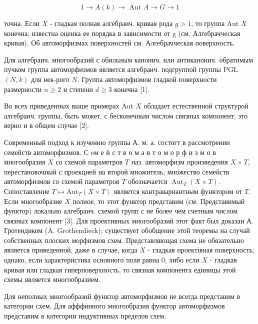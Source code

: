\documentclass[10pt]{article}
\begin{document}
\[

1 \longrightarrow A(k) \longrightarrow \text { Aut } A \longrightarrow G \longrightarrow 1

\]



точна. Если $X$ - гладкая полная алгебраич. кривая рода $g>1$, то группа Aut $X$ конечна; известна оценка ее порядка в зависимости от g (см. Алгебрачческая кривая). Об автоморфизмах поверхностей см. Алгебрачческая поверхность.



Для алгебраич. многообразий с обильным канонич. или антиканонич. обратимым пучком группа автоморфизмов является алгебраич. подгруппой группы PGL $(N, k)$ для нек-рого $N$. Группа автоморфизмов гладкой поверхности размерности $n \geqslant 2$ и степени $d \geqslant 3$ конечна [1].



Во всех приведенных выше примерах Aut $X$ обладает естественной структурой алгебраич. группы, быть может, с бесконечным числом связных компонент; это верно и в общем случае [2].



Современный подход к изучению группы А. м. а. состогт в рассмотрении семейств автоморфизмов. С eм е ӥ с т в о м а в т о м о р ф и з м о в многообразия $X$ со схемой параметров $T$ наз. автоморфизм произведения $X \times T$, перестановочный с проекцией на второй множитель; множество семейств автоморфизмов со схемой параметров $T$ обозначается $\operatorname{Aut}_{T}(X \times T)$. Сопоставление $T \mapsto \mathrm{Aut}_{T}(X \times T)$ является контравариантным функтором от $T$. Если многообразие $X$ полное, то этот функтор представим (см. Представимый функтор) локально алгебраич. схемой групп с не более чем счетным числом связных компонент [3]. Для проективных многообразий этот факт был доказан А. Гротендиком (A. Grothendieck); существует обобщение этой теоремы на случай собственных плоских морфизмов схем. Представляющая схема не обязательно является приведенной, даже в случае, когда $X$ - гладкая проектівная поверхность; однако, если характеристика основного поля равна 0, либо если $X$ - гладкая кривая или гладкая гиперповерхность, то связная компонента единицы этой схемы является многообразием.



Для неполных многообразий функтор автоморфизмов не всегда представим в категории схем. Для афффинного многообразия функтор автоморфизмов представим в категории индуктивных пределов схем.
\end{document}
